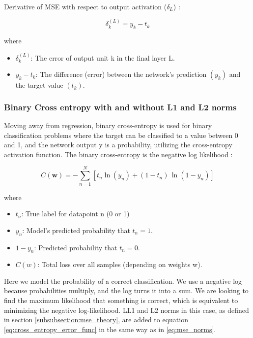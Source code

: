 \documentclass[amssymb,twocolumn,aps,floatfix]{revtex4-2}
\begin{document}
Derivative of MSE with respect to output activation ($\delta_L$) \citep[p.~234]{bishop2006pattern}:

\begin{equation}
    \delta_k^{(L)} = y_k - t_k
    \label{eq:mse_output_error}
\end{equation}

where 

\begin{itemize}
    \item $\delta_k^{(L)}$: The error of output unit k in the final layer L. 
    \item $y_k - t_k$: The difference (error) between the network's prediction $(y_k)$ and the target value $(t_k)$. 
\end{itemize}



\subsubsection{Binary Cross entropy with and without L1 and L2 norms}
\label{subsubsection:binary_cross_theory}

Moving away from regression, binary cross-entropy is used for binary classification problems where the target can be classified to a value between 0 and 1, and the network output y is a probability, utilizing the cross-entropy activation function. The binary cross-entropy is the negative log likelihood \citep[p.~235]{bishop2006pattern} \cite{compfys_ch14}: 

\begin{equation}
    C(\mathbf{w}) = - \sum_{n=1}^{N} \left[ t_n \ln(y_n) + (1 - t_n)\,\ln(1 - y_n) \right]
\label{eq:cross_entropy_error_func}
\end{equation}

where

\begin{itemize}
    \item $t_n$: True label for datapoint n (0 or 1)
    \item $y_n$: Model's predicted probability that $t_n = 1$.
    \item $1 - y_n$: Predicted probability that $t_n = 0$. 
    \item $C(w)$: Total loss over all samples (depending on weights w). 
\end{itemize}

Here we model the probability of a correct classification. We use a negative log because probabilities multiply, and the log turns it into a sum. We are looking to find the maximum likelihood that something is correct, which is equivalent to minimizing the negative log-likelihood. LL1 and L2 norms in this case, as defined in section \ref{subsubsection:mse_theory}, are added to equation \ref{eq:cross_entropy_error_func} in the same way as in \ref{eq:mse_norms}.
\end{document}
